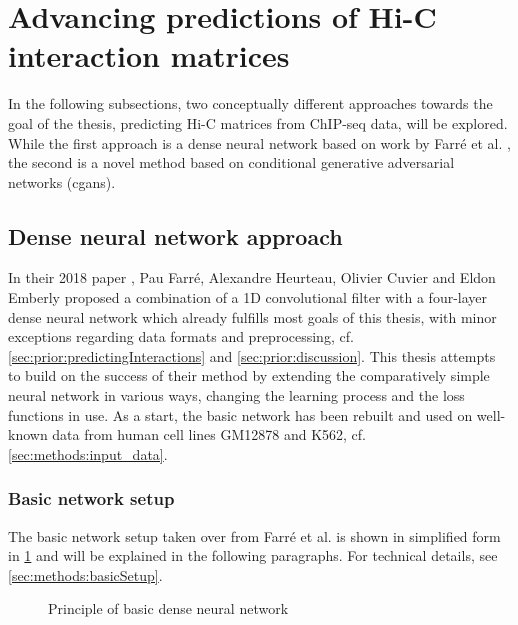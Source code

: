 \section{Advancing predictions of Hi-C interaction matrices}
In the following subsections, two conceptually different approaches towards the goal of the thesis,
predicting Hi-C matrices from ChIP-seq data, will be explored.
While the first approach is a dense neural network based on work by Farr\'e et al. \cite{Farre2018a},
the second is a novel method based on conditional generative adversarial networks (\acrshort{cgan}s).

\subsection{Dense neural network approach}\label{sec:improve:DNNapproach}
In their 2018 paper \cite{Farre2018a}, Pau Farr\'e, Alexandre Heurteau, Olivier Cuvier and Eldon Emberly
proposed a combination of a 1D convolutional filter with a four-layer dense neural network 
which already fulfills most goals of this thesis, with minor exceptions regarding data formats and preprocessing, 
cf. \cref{sec:prior:predictingInteractions} and \ref{sec:prior:discussion}.
This thesis attempts to build on the success of their method by extending the comparatively simple neural network
in various ways, changing the learning process and the loss functions in use.
As a start, the basic network has been rebuilt and used on well-known data from human cell lines GM12878 and K562, cf. \cref{sec:methods:input_data}.

\subsubsection{Basic network setup} \label{sec:improve:basicNetwork}
The basic network setup taken over from Farr\'e et al. \cite{Farre2018a} is shown in simplified form in \cref{fig:improve:priciple_basic_dnn}
and will be explained in the following paragraphs. For technical details, see \cref{sec:methods:basicSetup}.
\begin{figure}[hbp]
    \small
    \centering
    \caption{Principle of basic dense neural network}
    \label{fig:improve:priciple_basic_dnn}
\end{figure}

